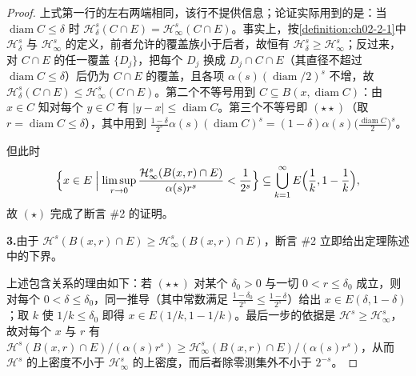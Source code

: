 \documentclass[../../main.tex]{subfiles}%
\begin{document}
\begin{proof}
上式第一行的左右两端相同，该行不提供信息；论证实际用到的是：当 $\operatorname{diam}C\leqslant\delta$ 时 $\mathcal{H}^s_\delta(C\cap E)=\mathcal{H}^s_\infty(C\cap E)$。事实上，按\cref{definition:ch02-2-1}中 $\mathcal{H}^s_\delta$ 与 $\mathcal{H}^s_\infty$ 的定义，前者允许的覆盖族小于后者，故恒有 $\mathcal{H}^s_\delta\geqslant\mathcal{H}^s_\infty$；反过来，对 $C\cap E$ 的任一覆盖 $\{D_j\}$，把每个 $D_j$ 换成 $D_j\cap C\cap E$（其直径不超过 $\operatorname{diam}C\leqslant\delta$）后仍为 $C\cap E$ 的覆盖，且各项 $\alpha(s)(\operatorname{diam}/2)^s$ 不增，故 $\mathcal{H}^s_\delta(C\cap E)\leqslant\mathcal{H}^s_\infty(C\cap E)$。第二个不等号用到 $C\subseteq B(x,\operatorname{diam}C)$：由 $x\in C$ 知对每个 $y\in C$ 有 $\lvert y-x\rvert\leqslant\operatorname{diam}C$。第三个不等号即 $(\star\star)$（取 $r=\operatorname{diam}C\leqslant\delta$），其中用到 $\frac{1-\delta}{2^s}\alpha(s)(\operatorname{diam}C)^s=(1-\delta)\alpha(s)\bigl(\frac{\operatorname{diam}C}{2}\bigr)^s$。%

但此时
\begin{align*}
\Bigl\{x\in E\Bigm|\limsup_{r\to0}\frac{\mathcal{H}^s_\infty(B(x,r)\cap E)}{\alpha(s)r^s}<\frac{1}{2^s}\Bigr\}\subseteq\bigcup_{k=1}^{\infty}E\Bigl(\frac{1}{k},1-\frac{1}{k}\Bigr),
\end{align*}
故 $(\star)$ 完成了断言 \#2 的证明。

\textbf{3.}由于 $\mathcal{H}^s(B(x,r)\cap E)\geqslant\mathcal{H}^s_\infty(B(x,r)\cap E)$，断言 \#2 立即给出定理陈述中的下界。

上述包含关系的理由如下：若 $(\star\star)$ 对某个 $\delta_0>0$ 与一切 $0<r\leqslant\delta_0$ 成立，则对每个 $0<\delta\leqslant\delta_0$，同一推导（其中常数满足 $\frac{1-\delta_0}{2^s}\leqslant\frac{1-\delta}{2^s}$）给出 $x\in E(\delta,1-\delta)$；取 $k$ 使 $1/k\leqslant\delta_0$ 即得 $x\in E(1/k,1-1/k)$。最后一步的依据是 $\mathcal{H}^s\geqslant\mathcal{H}^s_\infty$，故对每个 $x$ 与 $r$ 有 $\mathcal{H}^s(B(x,r)\cap E)/(\alpha(s)r^s)\geqslant\mathcal{H}^s_\infty(B(x,r)\cap E)/(\alpha(s)r^s)$，从而 $\mathcal{H}^s$ 的上密度不小于 $\mathcal{H}^s_\infty$ 的上密度，而后者除零测集外不小于 $2^{-s}$。
\end{proof}
\end{document}
